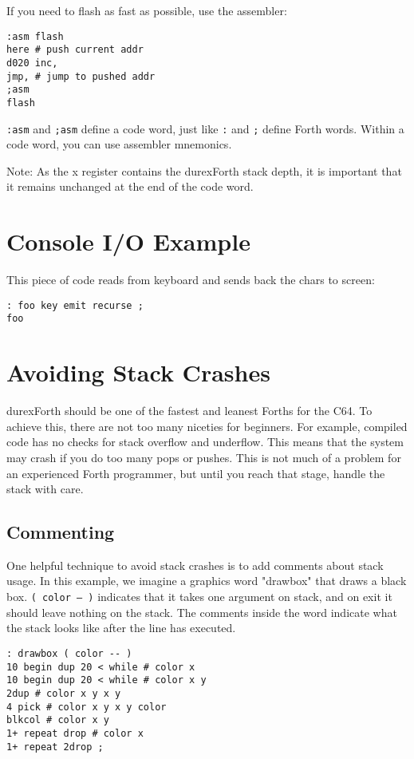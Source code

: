 If you need to flash as fast as possible, use the assembler:

\begin{verbatim}
:asm flash
here # push current addr
d020 inc,
jmp, # jump to pushed addr
;asm
flash
\end{verbatim}

\texttt{:asm} and \texttt{;asm} define a code word, just like \texttt{:} and \texttt{;} define Forth words. Within a code word, you can use assembler mnemonics. 

Note: As the x register contains the durexForth stack depth, it is important that it remains unchanged at the end of the code word.

\section{Console I/O Example}

This piece of code reads from keyboard and sends back the chars to screen:

\begin{verbatim}
: foo key emit recurse ;
foo
\end{verbatim}

\section{Avoiding Stack Crashes}

durexForth should be one of the fastest and leanest Forths for the C64. To achieve this, there are
not too many niceties for beginners. For example, compiled code has no checks for stack overflow
and underflow. This means that the system may crash if you do too many pops or pushes. This is not
much of a problem for an experienced Forth programmer, but until you reach that stage, handle the
stack with care.

\subsection{Commenting}

One helpful technique to avoid stack crashes is to add comments about stack usage.
In this example, we imagine a graphics word "drawbox" that draws a black box.
\texttt{( color -- )} indicates that it takes one argument on stack, and on exit it should
leave nothing on the stack. The comments inside the word indicate what the stack
looks like after the line has executed.

\begin{verbatim}
: drawbox ( color -- )
10 begin dup 20 < while # color x
10 begin dup 20 < while # color x y
2dup # color x y x y
4 pick # color x y x y color
blkcol # color x y
1+ repeat drop # color x
1+ repeat 2drop ;
\end{verbatim}

